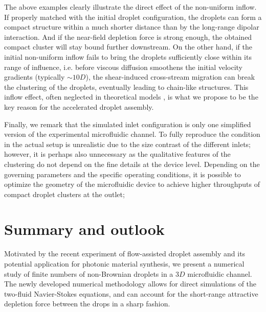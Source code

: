 The above examples clearly illustrate the direct effect of the non-uniform inflow. If properly matched with the initial droplet configuration, the droplets can form a compact structure within a much shorter distance than by the long-range dipolar interaction. And if the near-field depletion force is strong enough, the obtained compact cluster will stay bound further downstream. On the other hand, if the initial non-uniform inflow fails to bring the droplets sufficiently close within its range of influence, i.e. before viscous diffusion smoothens the initial velocity gradients (typically $\sim 10D$), the shear-induced cross-stream migration can break the clustering of the droplets, eventually leading to chain-like structures. This inflow effect, often neglected in theoretical models \citep{Shen_2016AS}, is what we propose to be the key reason for the accelerated droplet assembly.

Finally, we remark that the simulated inlet configuration is only one simplified version of the experimental microfluidic channel. To fully reproduce the condition in the actual setup is unrealistic due to the size contrast of the different inlets; however, it is perhaps also unnecessary as the qualitative features of the clustering do not depend on the fine details at the device level. Depending on the governing parameters and the specific operating conditions, it is possible to optimize the geometry of the microfluidic device to achieve higher throughputs of compact droplet clusters at the outlet; 


\section{Summary and outlook}
\label{sec:summary}

Motivated by the recent experiment of flow-assisted droplet assembly \citep{Shen_2016AS} and its potential application for photonic material synthesis, we present a numerical study of finite numbers of non-Brownian droplets in a $3D$ microfluidic channel. The newly developed numerical methodology \citep{ICLS} allows for direct simulations of the two-fluid Navier-Stokes equations, and can account for the short-range attractive depletion force between the drops in a sharp fashion.

